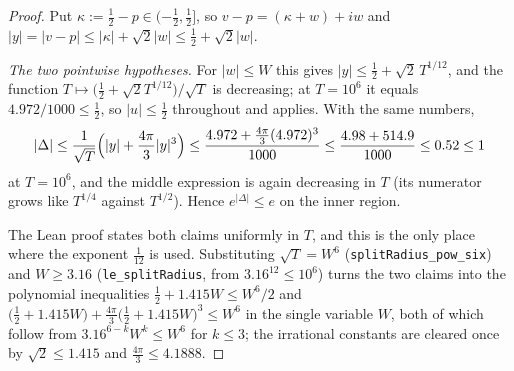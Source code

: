 \begin{proof}
\leanok
{}
Put $\kappa:=\tfrac12-p\in(-\tfrac12,\tfrac12]$, so $v-p=(\kappa+w)+iw$ and
$\lvert y\rvert=\lvert v-p\rvert\le\lvert\kappa\rvert+\sqrt2\lvert w\rvert
\le\tfrac12+\sqrt2\lvert w\rvert$.

\emph{The two pointwise hypotheses.}  For $\lvert w\rvert\le W$ this gives
$\lvert y\rvert\le\tfrac12+\sqrt2\,T^{1/12}$, and the function
$T\mapsto\bigl(\tfrac12+\sqrt2T^{1/12}\bigr)/\sqrt T$ is decreasing; at $T=10^{6}$ it equals
$4.972/1000\le\tfrac12$, so $\lvert u\rvert\le\tfrac12$ throughout and
 applies.  With the same numbers,
\[
  \lvert\Delta\rvert\le\frac{1}{\sqrt T}\Bigl(\lvert y\rvert+\frac{4\pi}{3}\lvert y\rvert^{3}\Bigr)
  \le\frac{4.972+\frac{4\pi}{3}(4.972)^{3}}{1000}\le\frac{4.98+514.9}{1000}\le0.52\le1
\]
at $T=10^{6}$, and the middle expression is again decreasing in $T$ (its numerator grows like
$T^{1/4}$ against $T^{1/2}$).  Hence $e^{\lvert\Delta\rvert}\le e$ on the inner region.

The Lean proof states both claims uniformly in $T$, and this is the only place where the
exponent $\tfrac1{12}$ is used.  Substituting $\sqrt T=W^{6}$
(\texttt{splitRadius\_pow\_six}) and $W\ge3.16$ (\texttt{le\_splitRadius}, from
$3.16^{12}\le10^{6}$) turns the two claims into the polynomial inequalities
$\tfrac12+1.415W\le W^{6}/2$ and
$\bigl(\tfrac12+1.415W\bigr)+\tfrac{4\pi}{3}\bigl(\tfrac12+1.415W\bigr)^{3}\le W^{6}$ in the
single variable $W$, both of which follow from $3.16^{6-k}W^{k}\le W^{6}$ for $k\le3$; the
irrational constants are cleared once by $\sqrt2\le1.415$ and $\tfrac{4\pi}{3}\le4.1888$.


\end{proof}
